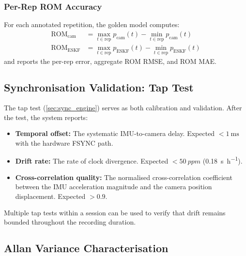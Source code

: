 \subsubsection{Per-Rep ROM Accuracy}

For each annotated repetition, the golden model computes:
\begin{align}
  \text{ROM}_\text{cam} &= \max_{t \in \text{rep}} p_\text{cam}(t) - \min_{t \in \text{rep}} p_\text{cam}(t) \\
  \text{ROM}_\text{ESKF} &= \max_{t \in \text{rep}} p_\text{ESKF}(t) - \min_{t \in \text{rep}} p_\text{ESKF}(t)
\end{align}
and reports the per-rep error, aggregate ROM RMSE, and ROM MAE.


\subsection{Synchronisation Validation: Tap Test}

The tap test (\cref{sec:sync_engine}) serves as both calibration and validation.
After the test, the system reports:
\begin{itemize}[nosep]
  \item \textbf{Temporal offset:} The systematic IMU-to-camera delay. Expected $< \SI{1}{\milli\second}$ with the hardware FSYNC path.
  \item \textbf{Drift rate:} The rate of clock divergence. Expected $< \SI{50}{ppm}$ (\SI{0.18}{\second\per\hour}).
  \item \textbf{Cross-correlation quality:} The normalised cross-correlation coefficient between the IMU acceleration magnitude and the camera position displacement. Expected $> 0.9$.
\end{itemize}

Multiple tap tests within a session can be used to verify that drift remains bounded throughout the recording duration.


\subsection{Allan Variance Characterisation}

